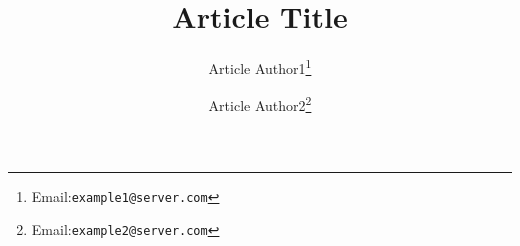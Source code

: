 \title{Article Title}
\author{Article Author1\thanks{Email:\texttt{example1@server.com} }}
\author{Article Author2\thanks{Email:\texttt{example2@server.com} }}
\date{}
\linespread{1.0}
\maketitle
\linespread{1.5}
